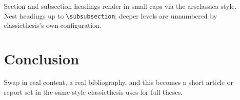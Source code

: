 \documentclass[11pt,a4paper]{scrartcl} %
\begin{document}
Section and subsection headings render in small caps via the arsclassica
style. Nest headings up to \verb|\subsubsection|; deeper levels are
unnumbered by classicthesis's own configuration.

\section{Conclusion}
\label{sec:conclusion}

Swap in real content, a real bibliography, and this becomes a short article
or report set in the same style classicthesis uses for full theses.



\end{document}
